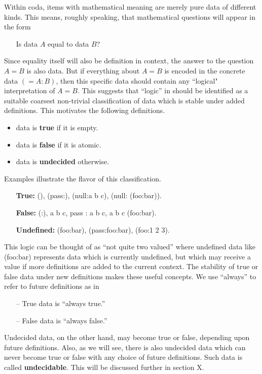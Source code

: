 \documentclass[11pt]{article}
\begin{document}
Within coda, items with mathematical meaning are merely pure data of different kinds.  This means, roughly speaking, that mathematical questions will appear in the form 
\begin{itemize}
\item[] Is data $A$ equal to data $B$?
\end{itemize}
Since equality itself will also be definition in context, the answer to the question $A=B$ is also data.  But if everything about $A=B$ is encoded in the concrete data $(= A:B)$, then 
this specific data should contain any ``logical" interpretation of $A=B$.  This suggests that ``logic'' in should be identified as a suitable coarsest non-trivial classification of data which is stable under 
added definitions.  This motivates the following definitions.
\begin{itemize}
\item data is {\bf true} if it is empty.
\item data is {\bf false} if it is atomic. 
\item data is {\bf undecided} otherwise. 
\end{itemize}
Examples illustrate the flavor of this classification.  
\begin{itemize}
\item[] {\bf True:} (), (pass:), (null:a b c), (null: (foo:bar)).
\item[] {\bf False:} (:), a b c, pass : a b c, a b c (foo:bar).
\item[] {\bf Undefined:}  (foo:bar), (pass:foo:bar), (foo:1 2 3).
\end{itemize}
This logic can be thought of as ``not quite two valued'' where undefined data like (foo:bar) represents data which is currently undefined, but which may receive a value if more definitions are added to the current context.  The stability of true or false data under new definitions makes these useful concepts.  We use ``always'' to refer to future definitions as in
\begin{itemize}
\item[--] True data is ``always true.''
\item[--] False data is ``always false.''
\end{itemize}
Undecided data, on the other hand, may become true or false, depending upon future definitions.  Also, as we will see, there is 
also undecided data which can never become true or false with any choice of future definitions.  Such data is called {\bf undecidable}.  
This will be discussed further in section X. 
\end{document}
